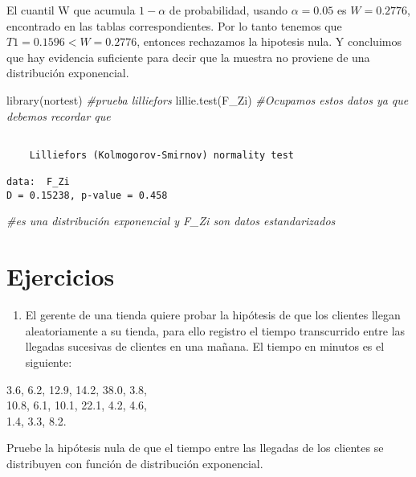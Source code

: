 \documentclass[
  a4paper,
  oneside,
  openany]{book}
\newenvironment{Shaded}{\begin{snugshade}}{\end{snugshade}}
\newcommand{\CommentTok}[1]{\textcolor[rgb]{0.56,0.35,0.01}{\textit{#1}}}
\newcommand{\FunctionTok}[1]{\textcolor[rgb]{0.00,0.00,0.00}{#1}}
\newcommand{\NormalTok}[1]{#1}
\providecommand{\tightlist}{%
  \setlength{\itemsep}{0pt}\setlength{\parskip}{0pt}}
\begin{document}
El cuantil W que acumula \(1-\alpha\) de probabilidad, usando \(\alpha=0.05\) es \(W = 0.2776\), encontrado en las tablas correspondientes. Por lo tanto tenemos que \(T1=0.1596 < W=0.2776\), entonces rechazamos la hipotesis nula. Y concluimos que hay evidencia suficiente para decir que la muestra no proviene de una distribución exponencial.

\begin{Shaded}
\begin{Highlighting}[]
\FunctionTok{library}\NormalTok{(nortest) }\CommentTok{\#prueba lilliefors}
\FunctionTok{lillie.test}\NormalTok{(F\_Zi) }\CommentTok{\#Ocupamos estos datos ya que debemos recordar que }
\end{Highlighting}
\end{Shaded}

\begin{verbatim}

    Lilliefors (Kolmogorov-Smirnov) normality test

data:  F_Zi
D = 0.15238, p-value = 0.458
\end{verbatim}

\begin{Shaded}
\begin{Highlighting}[]
                   \CommentTok{\#es una distribución exponencial y F\_Zi son datos estandarizados }
\end{Highlighting}
\end{Shaded}

\hypertarget{ejercicios-13}{%
\section{Ejercicios}\label{ejercicios-13}}

\begin{enumerate}
\def\labelenumi{\arabic{enumi}.}
\tightlist
\item
  El gerente de una tienda quiere probar la hipótesis de que los clientes llegan aleatoriamente a su tienda, para ello registro el tiempo transcurrido entre las llegadas sucesivas de clientes en una mañana. El tiempo en minutos es el siguiente:
\end{enumerate}

3.6, 6.2, 12.9, 14.2, 38.0, 3.8,\\
10.8, 6.1, 10.1, 22.1, 4.2, 4.6,\\
1.4, 3.3, 8.2.

Pruebe la hipótesis nula de que el tiempo entre las llegadas de los clientes se distribuyen con función de distribución exponencial.
\end{document}
